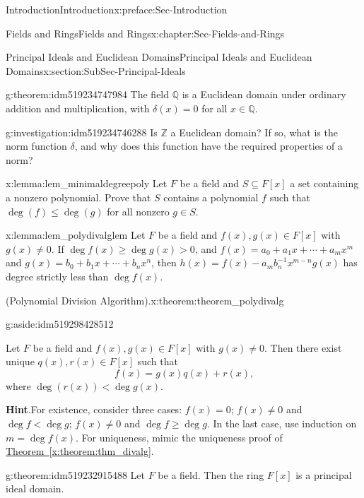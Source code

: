 \documentclass[oneside,10pt,]{book}
\newcommand{\blocktitlefont}{\relax}
\newcommand{\xreffont}{\relax}
\numberwithin{equation}{section}
\renewcommand{\le}{\leqslant}
\renewcommand{\ge}{\geqslant}
\def\Z{{\mathbb Z}}
\def\Q{{\mathbb Q}}
\newcommand{\lt}{<}
\begin{document}
\begin{preface}{Introduction}{}{Introduction}{}{}{x:preface:Sec-Introduction}
\begin{chapterptx}{Fields and Rings}{}{Fields and Rings}{}{}{x:chapter:Sec-Fields-and-Rings}
\begin{sectionptx}{Principal Ideals and Euclidean Domains}{}{Principal Ideals and Euclidean Domains}{}{}{x:section:SubSec-Principal-Ideals}
\begin{theorem}{}{}{g:theorem:idm519234747984}
The field \(\Q\) is a Euclidean domain under ordinary addition and multiplication, with \(\delta(x) = 0\) for all \(x\in \Q\).%
\end{theorem}
\begin{investigation}{}{g:investigation:idm519234746288}%
Is \(\Z\) a Euclidean domain? If so, what is the norm function \(\delta\), and why does this function have the required properties of a norm?%
\end{investigation}
\begin{lemma}{}{}{x:lemma:lem_minimaldegreepoly}%
Let \(F\) be a field and \(S\subseteq F[x]\) a set containing a nonzero polynomial. Prove that \(S\) contains a polynomial \(f\) such that \(\deg(f) \le \deg(g)\) for all nonzero \(g\in S\).%
\end{lemma}
\begin{lemma}{}{}{x:lemma:lem_polydivalglem}%
Let \(F\) be a field and \(f(x),g(x)\in F[x]\) with \(g(x)\ne 0\). If \(\deg f(x) \ge \deg g(x) > 0\), and \(f(x) = a_0 + a_1 x + \cdots + a_m x^m\) and \(g(x) = b_0 + b_1 x + \cdots + b_n x^n\), then \(h(x) = f(x) - a_m b_n^{-1} x^{m-n} g(x)\) has degree strictly less than \(\deg f(x)\).%
\end{lemma}
\begin{theorem}{(Polynomial Division Algorithm).}{}{x:theorem:theorem_polydivalg}%
\begin{aside}{}{g:aside:idm519298428512}%
\end{aside}
Let \(F\) be a field and \(f(x),g(x)\in F[x]\) with \(g(x)\ne 0\). Then there exist unique \(q(x),
r(x) \in F[x]\) such that%
\begin{equation*}
f(x) = g(x) q(x) + r(x)\text{,}
\end{equation*}
where \(\deg(r(x)) \lt  \deg g(x)\).%


\textbf{\blocktitlefont Hint}.\quad{}For existence, consider three cases: \(f(x) = 0\); \(f(x) \ne 0\) and \(\deg f \lt \deg g\); \(f(x) \ne 0\) and \(\deg f \ge \deg g\). In the last case, use induction on \(m = \deg f(x)\). For uniqueness, mimic the uniqueness proof of \hyperref[x:theorem:thm_divalg]{Theorem~{\xreffont\ref{x:theorem:thm_divalg}}}.%
\end{theorem}
\begin{theorem}{}{}{g:theorem:idm519232915488}%
Let \(F\) be a field. Then the ring \(F[x]\) is a principal ideal domain.%



\end{theorem}
\end{sectionptx}
\end{chapterptx}
\end{preface}
\end{document}
